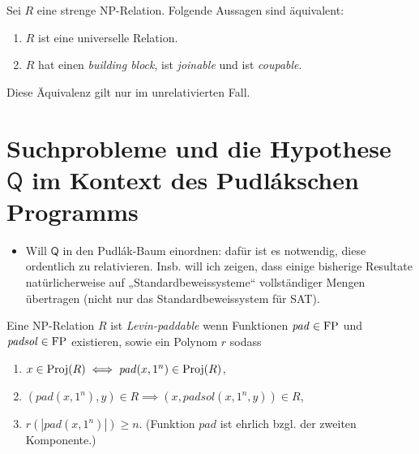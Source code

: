 \begin{theorem}
    Sei $R$ eine strenge NP-Relation.
    Folgende Aussagen sind äquivalent:
    \begin{enumerate}
        \item $R$ ist eine universelle Relation.
        \item $R$ hat einen \emph{building block}, ist \emph{joinable} und ist \emph{coupable}.
    \end{enumerate}
    Diese Äquivalenz gilt nur im unrelativierten Fall.
\end{theorem}

\chapter{Suchprobleme und die Hypothese $\mathsf{Q}$ im Kontext des Pudlákschen Programms}

\begin{itemize}
    \item Will $\mathsf{Q}$ in den Pudlák-Baum einordnen: dafür ist es notwendig, diese ordentlich zu relativieren. Insb. will ich zeigen, dass einige bisherige Resultate natürlicherweise auf „Standardbeweissysteme“ vollständiger Mengen übertragen (nicht nur das Standardbeweissystem für SAT).
\end{itemize}


\begin{definition}\label{def:levin-paddable}
    Eine NP-Relation $R$ ist \emph{Levin-paddable} wenn 
    Funktionen $\mathit{pad}\in\mathrm{FP}$ und $\mathit{padsol}\in\mathrm{FP}$ existieren, sowie ein Polynom $r$ sodass
    \begin{enumerate}
        \item $x\in \operatorname{Proj}(R) \iff \mathit{pad}(x, 1^n) \in \operatorname{Proj}(R)$,
        \item $(\mathit{pad}(x, 1^n), y)\in R \implies (x, \mathit{padsol}(x, 1^n, y)) \in R$,
        \item $r(|\mathit{pad}(x, 1^n)|)\geq n$. (Funktion $\mathit{pad}$ ist ehrlich bzgl. der zweiten Komponente.)\qedhere
    \end{enumerate}
\end{definition}

